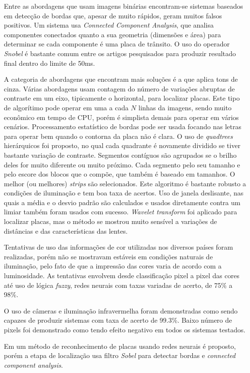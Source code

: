 Entre as abordagens que usam imagens binárias encontram-se sistemas baseados em
detecção de bordas que, apesar de muito rápidos, geram
muitos falsos positivos. Um sistema usa \emph{Connected Component Analysis},
que analisa componentes conectados quanto a sua geometria (dimensões e
área) para determinar se cada componente é uma placa de trânsito. O uso
do operador \emph{Snobel} é bastante comum entre os artigos pesquisados para
produzir resultado final dentro do limite de 50ms.

A categoria de abordagens que encontram mais soluções é a que aplica tons de
cinza. Várias abordagens usam
contagem do número de variações abruptas de contraste em um eixo,
tipicamente o horizontal, para localizar placas. Este tipo de algorítimo
pode operar em uma a cada $N$ linhas da imagens, sendo muito econômico em
tempo de CPU, porém é simplista demais para operar em vários cenários.
Processamento estatístico de bordas pode ser usada focando nas letras
para operar bem quando o contorna da placa não é clara. O uso de
\emph{quadtrees} hierárquicos foi proposto, no qual cada quadrante é novamente
dividido se tiver bastante variação de contraste. Segmentos contíguos são
agrupados se o brilho deles for muito diferente ou muito próximo. Cada
segmento pelo seu tamanho e pelo escore dos blocos que o compõe, que
também é baseado em tamanhos. O melhor (ou melhores) \emph{strips} são
selecionados. Este algoritmo é bastante robusto a condições de iluminação e
tem boa taxa de acertos. Uso de janela deslisante, nas quais a média e o
desvio padrão são calculados e usados diretamente contra um limiar
também foram usados com sucesso. \emph{Wavelet transform} foi aplicado para
localizar placas, mas o método se mostrou muito sensível a variações de
distâncias e das características das lentes.

Tentativas de uso das informações de cor utilizadas nos diversos
países foram realizadas, porém não se mostravam estáveis em condições
naturais de iluminação, pelo fato de que a impressão das cores varia de
acordo com a luminosidade. As tentativas envolvem desde classificação
pixel a pixel das cores até uso de lógica \emph{fuzzy}, redes neurais com taxas
variadas de acerto, de 75\% a 98\%.

O uso de câmeras e iluminação infravermelha foram demonstradas
como sendo capazes de produzir sistemas com taxa de acerto de 99.3\%.
Baixo número de pixels foi demonstrado como tendo efeito negativo em
todos os sistemas testados.

Em  um método de reconhecimento de placas usando
redes neurais é proposto, porém a etapa de localização usa filtro \emph{Sobel}
para detectar bordas e \emph{connected component analysis}.

